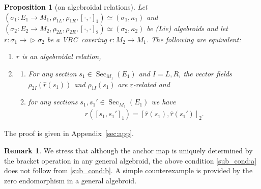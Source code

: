 \documentclass[10pt,a4paper]{amsart}
\newcommand{\ZM}{{VBC}} %
\newcommand{\und}{\underline}
\newcommand{\Sec}{\operatorname{Sec}}
\newcommand{\ra}{\rightarrow}
\def\relto{\rightarrow\!\!\vartriangleright} %
\numberwithin{equation}{section}
\newtheorem{prop}[thm]{Proposition}
\theoremstyle{definition}
\newtheorem{rem}[thm]{Remark}
\begin{document}
\begin{prop}[on algebroidal relations]\label{prop:algebroidal_relation} Let $(\sigma_1\colon E_1\ra M_1,\rho_{1L}, \rho_{1R},[\cdot,\cdot]_1)\simeq(\sigma_1,\kappa_1)$ and $(\sigma_2\colon E_2\ra M_2,\rho_{2L}, \rho_{2R},[\cdot,\cdot]_2)\simeq(\sigma_2,\kappa_2)$ be (Lie) algebroids and let $r\colon \sigma_1\relto \sigma_2$ be a \ZM\ covering $\und{r}\colon M_2\ra M_1$.
The following are equivalent:
\begin{enumerate}[$(i)$]\itemsep=0pt
\item\label{cond:alg_rel_1} $r$ is an algebroidal relation,
\item\label{cond:alg_rel_2}\begin{enumerate}[$(a)$]\itemsep=0pt
\item\label{sub_cond:a} For any section $s_1\in\Sec_{M_1}(E_1)$ and $I=L,R$, the vector fields $\rho_{2I} (\hat{r}(s_1))$ and $\rho_{1I}(s_1)$ are $\und{r}$-related and
\item\label{sub_cond:b} for any sections $s_1, s_1'\in \Sec_{M_1}(E_1)$ we have \begin{gather*} \hat{r}([s_1, s_1']_1) = [\hat{r}(s_1), \hat{r}(s_1')]_{2}.\end{gather*}
\end{enumerate}
\end{enumerate}
\end{prop}
The proof is given in Appendix~\ref{sec:app}.
\begin{rem} We stress that although the anchor map is uniquely determined by the bracket operation in any general algebroid, the above condition \eqref{sub_cond:a} does not follow from \eqref{sub_cond:b}. A simple counterexample is provided by the zero endomorphism in a general algebroid.
\end{rem}
\end{document}
